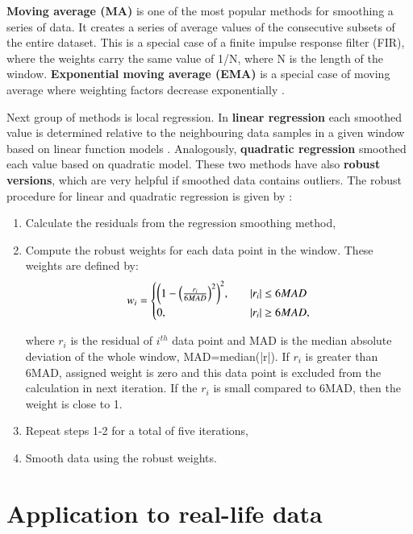 \documentclass{webofc}
\begin{document}
\textbf{Moving average (MA)} is one of the most popular methods for smoothing a series of data. It creates a series of average values of the consecutive subsets of the entire dataset. This is a special case of a finite impulse response filter (FIR), where the weights carry the same value of 1/N, where N is the length of the window. \textbf{Exponential moving average (EMA)} is a special case of moving average where weighting factors decrease exponentially \cite{hunter1986exponentially}.

Next group of methods is local regression. In \textbf{linear regression} each smoothed value is determined relative to the neighbouring data samples in a given window based on linear function models \cite{cleveland1996smoothing}. Analogously, \textbf{quadratic regression} smoothed each value based on quadratic model. These two methods have also \textbf{robust versions}, which are very helpful if smoothed data contains outliers. The robust procedure for linear and quadratic regression is given by \cite{cleveland1979robust}:

\begin{enumerate}
    \item Calculate the residuals from the regression smoothing method,
    \item Compute the robust weights for each data point in the window. These weights are defined by:
 \begin{equation}
 w_i =
  \begin{cases}
    $$\left( 1-\left( \frac{r_i}{6MAD} \right)^2 \right)^2$$,    & \quad |r_i| \leq 6MAD\\
    0,  & \quad |r_i| \geq 6MAD,\\
  \end{cases}
 \end{equation}       
 
    where $r_i$ is the residual of $i^{th}$ data point and MAD is the median absolute deviation of the whole window, MAD=median(|r|). If $r_i$ is greater than 6MAD, assigned weight is zero and this data point is excluded from the calculation in next iteration. If the $r_i$ is small compared to 6MAD, then the weight is close to 1.
    \item Repeat steps 1-2 for a total of five iterations,
    \item Smooth data using the robust weights.
\end{enumerate}

\section{Application to real-life data}
\end{document}

